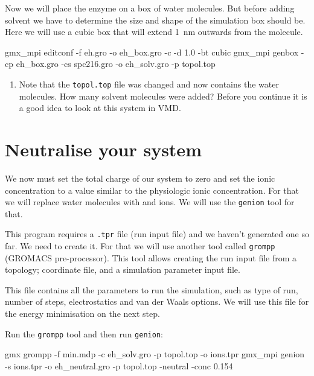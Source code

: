\documentclass[10pt]{article}
\begin{document}
Now we will place the enzyme on a box of water molecules. But before adding solvent we have to determine the size and shape of the simulation box should be. Here we will use a cubic box that will extend 1~nm outwards from the molecule.

\begin{cmdline}
gmx_mpi editconf -f eh.gro -o eh_box.gro -c -d 1.0 -bt cubic
gmx_mpi genbox -cp eh_box.gro -cs spc216.gro -o eh_solv.gro -p topol.top
\end{cmdline}

\vspace{-0.3cm}

\begin{summary} 
    \begin{enumerate}[leftmargin=0.6cm]
        \renewcommand{\labelenumi}{Q\arabic{enumi}.}
        \setcounter{enumi}{6}
        \item Note that the \texttt{topol.top} file was changed and now contains the water molecules. How many solvent molecules were added? Before you continue it is a good idea to look at this system in VMD. 
    \end{enumerate}
\end{summary}


\section{Neutralise your system}

We now must set the total charge of our system to zero and set the ionic concentration to a value similar to the physiologic ionic concentration. For that we will replace water molecules with  and  ions. We will use the \texttt{genion} tool for that. 

This program requires a \texttt{.tpr} file (run input file) and we haven't generated one so far. We need to create it. For that we will use another tool called \texttt{grompp} (GROMACS pre-processor). This tool allows creating the run input file from a topology; coordinate file, and a simulation parameter input file. 

This file contains all the parameters to run the simulation, such as type of run, number of steps, electrostatics and van der Waals options. We will use this file for the energy minimisation on the next step. 

Run the \texttt{grompp} tool and then run \texttt{genion}:
\begin{cmdline}
gmx grompp -f min.mdp -c eh_solv.gro -p topol.top -o ions.tpr
gmx_mpi genion -s ions.tpr -o eh_neutral.gro -p topol.top -neutral -conc 0.154 
\end{cmdline}
\end{document}
